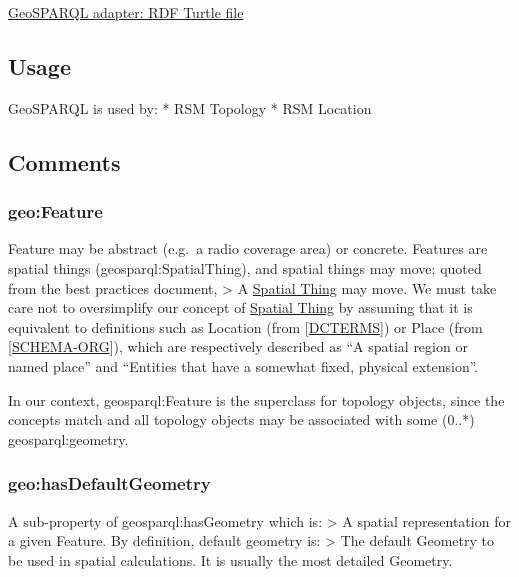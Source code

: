\documentclass[
  11pt,
]{article}
\begin{document}
\href{https://cdm.ovh/rsm/adapters/geosparql_apater/geosparql_adapter.ttl}{GeoSPARQL
adapter: RDF Turtle file}

\hypertarget{usage}{%
\subsection{Usage}\label{usage}}

GeoSPARQL is used by: * RSM Topology * RSM Location

\hypertarget{comments}{%
\subsection{Comments}\label{comments}}

\hypertarget{geofeature}{%
\subsubsection{geo:Feature}\label{geofeature}}

Feature may be abstract (e.g.~a radio coverage area) or concrete.
Features are spatial things (geosparql:SpatialThing), and spatial things
may move; quoted from the best practices document, \textgreater{} A
\href{https://w3c.github.io/sdw/bp/\#dfn-spatial-thing}{Spatial Thing}
may move. We must take care not to oversimplify our concept of
\href{https://w3c.github.io/sdw/bp/\#dfn-spatial-thing}{Spatial Thing}
by assuming that it is equivalent to definitions such as Location (from
{[}\href{https://w3c.github.io/sdw/bp/\#bib-dcterms}{DCTERMS}{]}) or
Place (from
{[}\href{https://w3c.github.io/sdw/bp/\#bib-schema-org}{SCHEMA-ORG}{]}),
which are respectively described as ``A spatial region or named place''
and ``Entities that have a somewhat fixed, physical extension''.

In our context, geosparql:Feature is the superclass for topology
objects, since the concepts match and all topology objects may be
associated with some (0..*) geosparql:geometry.

\hypertarget{geohasdefaultgeometry}{%
\subsubsection{geo:hasDefaultGeometry}\label{geohasdefaultgeometry}}

A sub-property of geosparql:hasGeometry which is: \textgreater{} A
spatial representation for a given Feature. By definition, default
geometry is: \textgreater{} The default Geometry to be used in spatial
calculations. It is usually the most detailed Geometry.
\end{document}
